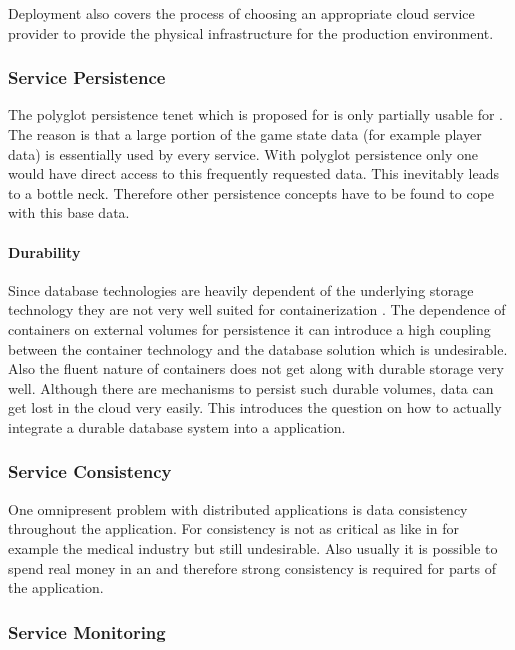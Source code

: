 Deployment also covers the process of choosing an appropriate cloud service
provider to provide the physical infrastructure for the production environment.

\subsubsection{Service Persistence}

The polyglot persistence tenet which is proposed for \mss{} is only partially
usable for \ogs{}. The reason is that a large portion of the game state data
(for example player data) is essentially used by every service. With polyglot
persistence only one \ms{} would have direct access to this frequently requested
data. This inevitably leads to a bottle neck. Therefore other persistence
concepts have to be found to cope with this base data.

\paragraph{Durability}

Since database technologies are heavily dependent of the underlying storage
technology they are not very well suited for containerization
\cite{cazorla2017db_containers}. The dependence of containers on external
volumes for persistence it can introduce a high coupling between the container
technology and the database solution which is undesirable. Also the fluent
nature of containers does not get along with durable storage very well. Although
there are mechanisms to persist such durable volumes, data can get lost in the
cloud very easily. This introduces the question on how to actually integrate a
durable database system into a \ms{} application.

\subsubsection{Service Consistency}

One omnipresent problem with distributed applications is data consistency
throughout the application. For \ogs{} consistency is not as critical as like in for example
the medical industry but still undesirable. Also usually it is possible to spend
real money in an \og{} and therefore strong consistency is required for parts of
the application. 

\subsubsection{Service Monitoring}


